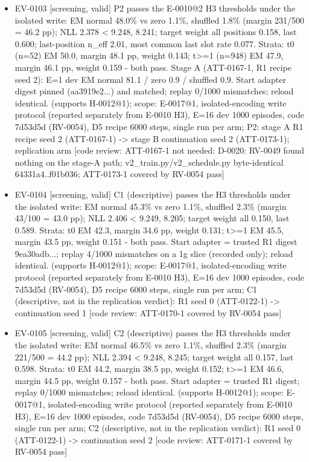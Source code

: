 \documentclass[11pt]{article}
\begin{document}
\begin{itemize}
\item EV-0103 [screening, valid] P2 passes the E-0010@2 H3 thresholds under the isolated write: EM normal 48.0\% vs zero 1.1\%, shuffled 1.8\% (margin 231/500 = 46.2 pp); NLL 2.378 \textless{} 9.248, 8.241; target weight all positions 0.158, last 0.600; last-position n\_eff 2.01, most common last slot rate 0.077. Strata: t0 (n=52) EM 50.0, margin 48.1 pp, weight 0.143; t\textgreater{}=1 (n=948) EM 47.9, margin 46.1 pp, weight 0.159 - both pass. Stage A (ATT-0167-1, R1 recipe seed 2): E=1 dev EM normal 81.1 / zero 0.9 / shuffled 0.9. Start adapter digest pinned (aa3919e2...) and matched; replay 0/1000 mismatches; reload identical. (supports H-0012@1); scope: E-0017@1, isolated-encoding write protocol (reported separately from E-0010 H3), E=16 dev 1000 episodes, code 7d53d5d (RV-0054), D5 recipe 6000 steps, single run per arm; P2: stage A R1 recipe seed 2 (ATT-0167-1) -\textgreater{} stage B continuation seed 2 (ATT-0173-1); replication arm [code review: ATT-0167-1 not needed: D-0020: RV-0049 found nothing on the stage-A path; v2\_train.py/v2\_schedule.py byte-identical 64331a4..f01b036; ATT-0173-1 covered by RV-0054 pass]
\item EV-0104 [screening, valid] C1 (descriptive) passes the H3 thresholds under the isolated write: EM normal 45.3\% vs zero 1.1\%, shuffled 2.3\% (margin 43/100 = 43.0 pp); NLL 2.406 \textless{} 9.249, 8.205; target weight all 0.150, last 0.589. Strata: t0 EM 42.3, margin 34.6 pp, weight 0.131; t\textgreater{}=1 EM 45.5, margin 43.5 pp, weight 0.151 - both pass. Start adapter = trusted R1 digest 9ea30adb...; replay 4/1000 mismatches on a 1g slice (recorded only); reload identical. (supports H-0012@1); scope: E-0017@1, isolated-encoding write protocol (reported separately from E-0010 H3), E=16 dev 1000 episodes, code 7d53d5d (RV-0054), D5 recipe 6000 steps, single run per arm; C1 (descriptive, not in the replication verdict): R1 seed 0 (ATT-0122-1) -\textgreater{} continuation seed 1 [code review: ATT-0170-1 covered by RV-0054 pass]
\item EV-0105 [screening, valid] C2 (descriptive) passes the H3 thresholds under the isolated write: EM normal 46.5\% vs zero 1.1\%, shuffled 2.3\% (margin 221/500 = 44.2 pp); NLL 2.394 \textless{} 9.248, 8.245; target weight all 0.157, last 0.598. Strata: t0 EM 44.2, margin 38.5 pp, weight 0.152; t\textgreater{}=1 EM 46.6, margin 44.5 pp, weight 0.157 - both pass. Start adapter = trusted R1 digest; replay 0/1000 mismatches; reload identical. (supports H-0012@1); scope: E-0017@1, isolated-encoding write protocol (reported separately from E-0010 H3), E=16 dev 1000 episodes, code 7d53d5d (RV-0054), D5 recipe 6000 steps, single run per arm; C2 (descriptive, not in the replication verdict): R1 seed 0 (ATT-0122-1) -\textgreater{} continuation seed 2 [code review: ATT-0171-1 covered by RV-0054 pass]

\end{itemize}
\end{document}
